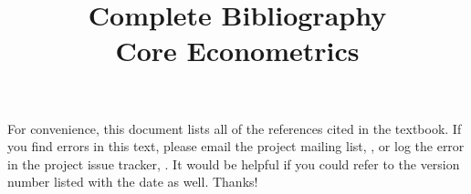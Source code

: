 \documentclass[nohyper]{tufte-handout}
\title[Complete bibliography]%
{Complete Bibliography \\
  Core Econometrics}
\begin{document}
\maketitle

For convenience, this document lists all of the references cited in
the textbook.  If you find errors in this text, please email the
project mailing list, \maillist, or log the error in the project issue
tracker, \bugtrack.  It would be helpful if you could refer to the
version number listed with the date as well.  Thanks!

\nocite{*}


\end{document}
